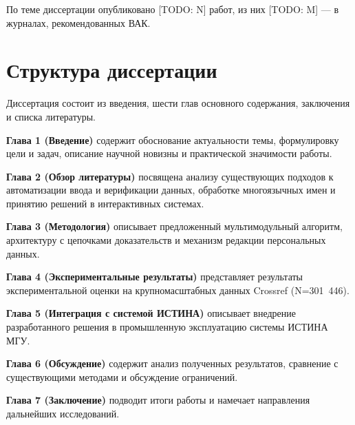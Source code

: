 По теме диссертации опубликовано [TODO: N] работ, из них [TODO: M] — в журналах, рекомендованных ВАК.

\section{Структура диссертации}
\label{sec:intro:structure}

Диссертация состоит из введения, шести глав основного содержания, заключения и списка литературы.

\textbf{Глава 1 (Введение)} содержит обоснование актуальности темы, формулировку цели и задач, описание научной новизны и практической значимости работы.

\textbf{Глава 2 (Обзор литературы)} посвящена анализу существующих подходов к автоматизации ввода и верификации данных, обработке многоязычных имен и принятию решений в интерактивных системах.

\textbf{Глава 3 (Методология)} описывает предложенный мультимодульный алгоритм, архитектуру с цепочками доказательств и механизм редакции персональных данных.

\textbf{Глава 4 (Экспериментальные результаты)} представляет результаты экспериментальной оценки на крупномасштабных данных Crossref (N=301~446).

\textbf{Глава 5 (Интеграция с системой ИСТИНА)} описывает внедрение разработанного решения в промышленную эксплуатацию системы ИСТИНА МГУ.

\textbf{Глава 6 (Обсуждение)} содержит анализ полученных результатов, сравнение с существующими методами и обсуждение ограничений.

\textbf{Глава 7 (Заключение)} подводит итоги работы и намечает направления дальнейших исследований.
